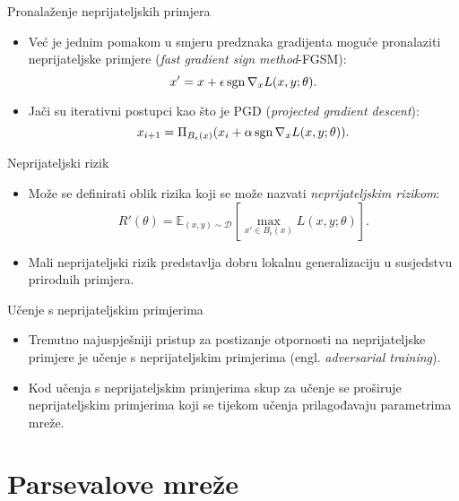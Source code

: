 \documentclass{beamer}
\begin{document}
\begin{frame}{Pronalaženje neprijateljskih primjera}
\begin{itemize}
	\item Već je jednim pomakom u smjeru predznaka gradijenta moguće pronalaziti neprijateljske primjere (\emph{fast gradient sign method}-FGSM):
	\begin{equation}
	x' = x + \epsilon\operatorname{sgn} \nabla_x L(x, y; \theta).
	\end{equation}
	\item Jači su iterativni postupci kao što je PGD (\emph{projected gradient descent}):
	\begin{equation} \label{eq:pgd}
	x_{i+1} = \Pi_{B_\epsilon(x)} (x_i + \alpha\operatorname{sgn} \nabla_x L(x, y; \theta)).
	\end{equation}
\end{itemize}
\end{frame}



\begin{frame}{Neprijateljski rizik}
\begin{itemize}
	\item Može se definirati oblik rizika koji se može nazvati \emph{neprijateljskim rizikom}:
	\begin{equation}\label{eq:adv-risk}
	R'(\theta) = \mathbb{E}_{(x,y)\sim\mathcal{D}}\left[
	\max_{x' \in B_\epsilon(x)} L(x, y; \theta) \right].
	\end{equation}
	\item Mali neprijateljski rizik predstavlja dobru lokalnu generalizaciju u susjedstvu prirodnih primjera.
\end{itemize}
\end{frame}

\begin{frame}{Učenje s neprijateljskim primjerima}
\begin{itemize}
	\item Trenutno najuspješniji pristup za postizanje otpornosti na neprijateljske primjere je učenje s neprijateljskim primjerima (engl. \emph{adversarial training}).
	\item Kod učenja s neprijateljskim primjerima skup za učenje se proširuje neprijateljskim primjerima koji se tijekom učenja prilagođavaju parametrima mreže.
\end{itemize}
\end{frame}

\section{Parsevalove mreže}
\end{document}
